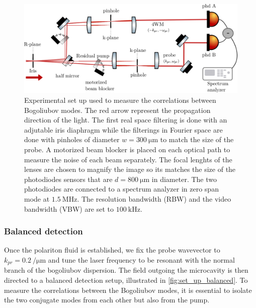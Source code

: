 \begin{figure}
    \centering
    \includegraphics[width=1\textwidth]{chap_correlation/fig/half_mirror.pdf}
    \caption{Experimental set up used to measure the correlations between Bogoliubov modes. The red arrow represent the propagation direction of the light.
    The first real space filtering is done with an adjutable iris diaphragm while the filterings in Fourier space are done with pinholes of diameter $w=\SI{300}{\micro\meter}$ to match the size of the 
    probe. A motorized beam blocker is placed on each optical path to measure the noise of each beam separately. The focal lenghts of the lenses are chosen to magnify the image so its matches the size of the photodiodes sensors that are $d=\SI{800}{\micro\meter}$ in diameter. The two photodiodes are connected to a spectrum analyzer in zero span mode at $\SI{1.5}{\mega\hertz}$. The resolution bandwidth (RBW) and the video bandwidth (VBW) are set to $\SI{100}{\kilo\hertz}$.}
    \label{fig:set_up_balanced}
\end{figure}

\subsubsection{Balanced detection}
Once the polariton fluid is established, we fix the probe wavevector to $k_{pr}=\SI{0.2}{\per\micro\meter}$ and tune the laser frequency to be resonant with the normal branch of the bogoliubov dispersion. The field outgoing the microcavity is then directed to a balanced detection setup, illustrated in \autoref{fig:set_up_balanced}.
To measure the correlations between the Bogoliubov modes, it is essential to isolate the two conjugate modes from each other but also from the pump. 

\bigskip

